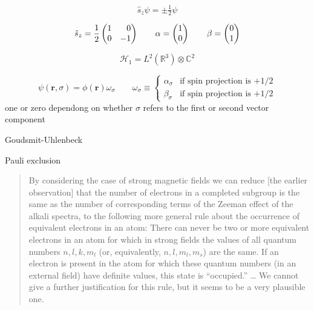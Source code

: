 \begin{equation}
    \hat{s}_z
    \psi
    =
    \pm
    \tfrac{1}{2}
    \psi
\end{equation}

\begin{equation}
    \hat{s}_z
    =
    \frac{1}{2}
    \begin{pmatrix}
        1 & \hphantom{+}0 \\
        0 & -1
    \end{pmatrix}
    \qquad
    \alpha
    =
    \begin{pmatrix}
        1 \\ 0
    \end{pmatrix}
    \qquad
    \beta
    =
    \begin{pmatrix}
        0 \\ 1
    \end{pmatrix}
\end{equation}

\begin{equation}
    \mathcal{H}_1
    =
    L^2(\mathbb{R}^3)
    \otimes
    \mathbb{C}^2
\end{equation}

\begin{equation}
    \psi(\mathbf{r}, \sigma)
    =
    \phi(\mathbf{r})
    \omega_\sigma
    \qquad
    \omega_\sigma
    \equiv
    \left\{
        \begin{array}{cl}
            \alpha_{\sigma}
            &
            \text{if spin projection is \(+1/2\)}
            \\[10pt]
            \beta_{\sigma}
            &
            \text{if spin projection is \(+1/2\)}
        \end{array}
    \right.
\end{equation}
one or zero dependong on whether \(\sigma\) refers to the first or second vector
component

\noindent
Goudsmit-Uhlenbeck\cite{Uhlenbeck:1926p264}

\noindent
Pauli exclusion\cite{Pauli:1925p756}
\begin{quote}
    By considering the case of strong magnetic fields we can reduce
    [the earlier observation] that the number of electrons in a completed
    subgroup is the same as the number of corresponding terms of the Zeeman
    effect of the alkali spectra, to the following more general rule about the
    occurrence of equivalent electrons in an atom:
    There can never be two or more equivalent electrons in an atom for which in
    strong fields the values of all quantum numbers \(n, l, k, m_l\) (or,
    equivalently, \(n, l, m_l, m_s\)) are the same.
    If an electron is present in the atom for which these quantum numbers (in an
    external field) have definite values, this state is ``occupied.''
    \dots
    We cannot give a further justification for this rule, but it seems to be a
    very plausible one.
\end{quote}

